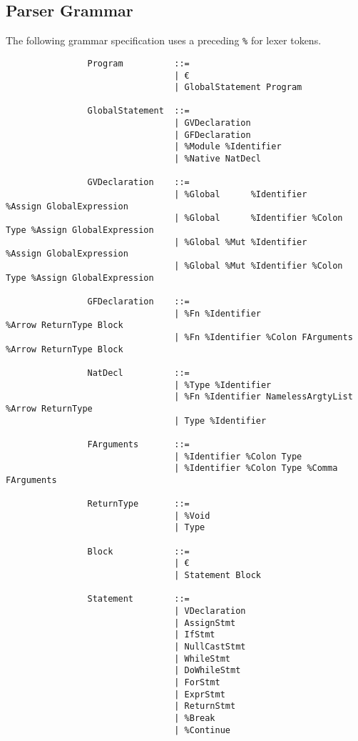 \documentclass{article}
\begin{document}
		\subsection{Parser Grammar}
		
			The following grammar specification uses a preceding \texttt{\%} for lexer tokens.
		
			\begin{verbatim}
				Program          ::=
				                 | €
				                 | GlobalStatement Program
				                 
				GlobalStatement  ::=
				                 | GVDeclaration
				                 | GFDeclaration
				                 | %Module %Identifier
				                 | %Native NatDecl
				                 
				GVDeclaration    ::=
				                 | %Global      %Identifier             %Assign GlobalExpression
				                 | %Global      %Identifier %Colon Type %Assign GlobalExpression
				                 | %Global %Mut %Identifier             %Assign GlobalExpression
				                 | %Global %Mut %Identifier %Colon Type %Assign GlobalExpression
				                 
				GFDeclaration    ::=
				                 | %Fn %Identifier                   %Arrow ReturnType Block
				                 | %Fn %Identifier %Colon FArguments %Arrow ReturnType Block
				                 
				NatDecl          ::=
				                 | %Type %Identifier
				                 | %Fn %Identifier NamelessArgtyList %Arrow ReturnType
				                 | Type %Identifier
				                 
				FArguments       ::=
				                 | %Identifier %Colon Type
				                 | %Identifier %Colon Type %Comma FArguments
				
				ReturnType       ::=
				                 | %Void
				                 | Type
				                 
				Block            ::=
				                 | €
				                 | Statement Block
				
				Statement        ::=
				                 | VDeclaration
				                 | AssignStmt
				                 | IfStmt
				                 | NullCastStmt
				                 | WhileStmt
				                 | DoWhileStmt
				                 | ForStmt
				                 | ExprStmt
				                 | ReturnStmt
				                 | %Break
				                 | %Continue
				                 

\end{verbatim}
\end{document}
